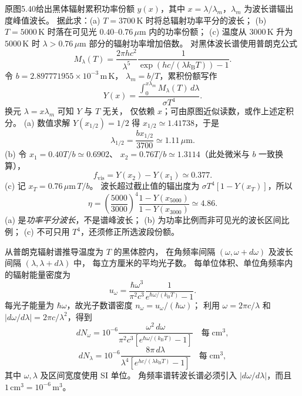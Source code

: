 原图5.40给出黑体辐射累积功率份额 $y(x)$，其中
$x=\lambda/\lambda_m$，$\lambda_m$ 为波长谱辐出度峰值波长。
据此求：(a) $T=3700\,\mathrm K$ 时将总辐射功率平分的波长；
(b) $T=5000\,\mathrm K$ 时落在可见光
$0.40$--$0.76\,\mu\mathrm m$ 内的功率份额；
(c) 温度从 $3000\,\mathrm K$ 升为 $5000\,\mathrm K$ 时
$\lambda>0.76\,\mu\mathrm m$ 部分的辐射功率增加倍数。
\exsolution
对黑体波长谱使用普朗克公式
\[
 M_\lambda(T)=\frac{2\pi hc^2}{\lambda^5}
 \frac1{\exp\!\left(hc/(\lambda k_{\mathrm B}T)\right)-1}.
\]
令 $b=2.897771955\times10^{-3}\,\mathrm{m\,K}$，
$\lambda_m=b/T$，累积份额写作
\[
 Y(x)=\frac{\displaystyle\int_0^{x\lambda_m}M_\lambda(T)\,d\lambda}
 {\sigma T^4}.
\]
换元 $\lambda=x\lambda_m$ 可知 $Y$ 与 $T$ 无关，
仅依赖 $x$；可由原图近似读数，或作上述定积分。
(a) 数值求解 $Y(x_{1/2})=1/2$ 得
$x_{1/2}\simeq1.41738$，于是
\[
 \boxed{\lambda_{1/2}=\frac{bx_{1/2}}{3700}
 \simeq1.11\,\mu\mathrm m}.
\]
(b) 令 $x_1=0.40T/b\simeq0.6902$、
$x_2=0.76T/b\simeq1.3114$（此处微米与 $b$ 一致换算），
\[
 \boxed{f_{\mathrm{vis}}=Y(x_2)-Y(x_1)\simeq0.377}.
\]
(c) 记 $x_T=0.76\,\mu\mathrm m\,T/b$。
波长超过截止值的辐出度为
$\sigma T^4[1-Y(x_T)]$，所以
\[
 \boxed{\eta=\left(\frac{5000}{3000}\right)^4
 \frac{1-Y(x_{5000})}{1-Y(x_{3000})}
 \simeq4.86}.
\]
\excheck (a) 是\emph{功率平分波长}，不是谱峰波长；
(b) 为功率比例而非可见光的波长区间比例；
(c) 不可只用 $T^4$，还须修正所选波段份额。

从普朗克辐射谱推导温度为 $T$ 的黑体腔内，
在角频率间隔 $(\omega,\omega+d\omega)$
及波长间隔 $(\lambda,\lambda+d\lambda)$ 中，
每立方厘米的平均光子数。
\exsolution
每单位体积、单位角频率内的辐射能量密度为
\[
 u_\omega=\frac{\hbar\omega^3}{\pi^2c^3}
 \frac1{e^{\hbar\omega/(k_{\mathrm B}T)}-1}.
\]
每光子能量为 $\hbar\omega$，故光子数谱密度
$n_\omega=u_\omega/(\hbar\omega)$；
利用 $\omega=2\pi c/\lambda$ 和
$|d\omega/d\lambda|=2\pi c/\lambda^2$，得到
\[
 \boxed{dN_\omega=
 10^{-6}\frac{\omega^2\,d\omega}{\pi^2c^3
 [e^{\hbar\omega/(k_{\mathrm B}T)}-1]}}
 \quad\text{每}\;\mathrm{cm^3},
\]
\[
 \boxed{dN_\lambda=
 10^{-6}\frac{8\pi\,d\lambda}{\lambda^4
 [e^{hc/(\lambda k_{\mathrm B}T)}-1]}}
 \quad\text{每}\;\mathrm{cm^3},
\]
其中 $\omega,\lambda$ 及区间宽度使用 SI 单位。
\excheck 角频率谱转波长谱必须引入
$|d\omega/d\lambda|$，而且 $1\,\mathrm{cm^3}=10^{-6}\,\mathrm{m^3}$。

